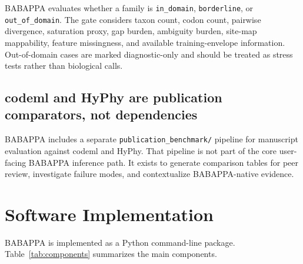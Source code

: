 \documentclass[11pt,a4paper]{article}
\begin{document}
BABAPPA evaluates whether a family is \texttt{in\_domain}, \texttt{borderline}, or \texttt{out\_of\_domain}. The gate considers taxon count, codon count, pairwise divergence, saturation proxy, gap burden, ambiguity burden, site-map mappability, feature missingness, and available training-envelope information. Out-of-domain cases are marked diagnostic-only and should be treated as stress tests rather than biological calls.

\subsection{codeml and HyPhy are publication comparators, not dependencies}

BABAPPA includes a separate \texttt{publication\_benchmark/} pipeline for manuscript evaluation against codeml and HyPhy. That pipeline is not part of the core user-facing BABAPPA inference path. It exists to generate comparison tables for peer review, investigate failure modes, and contextualize BABAPPA-native evidence.

\section{Software Implementation}

BABAPPA is implemented as a Python command-line package. Table~\ref{tab:components} summarizes the main components.
\end{document}
